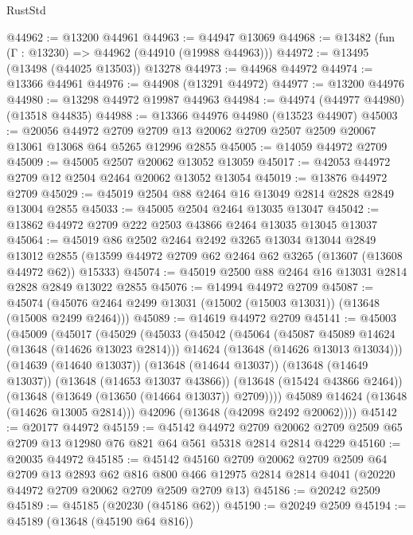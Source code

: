 \begin{lexlean}{RustStd}
\begin{coremodule}
@44962 := @13200 @44961
@44963 := @44947 @13069
@44968 := @13482 (fun (Γ : @13230) => @44962 (@44910 (@19988 @44963)))
@44972 := @13495 (@13498 (@44025 @13503)) @13278
@44973 := @44968 @44972
@44974 := @13366 @44961
@44976 := @44908 (@13291 @44972)
@44977 := @13200 @44976
@44980 := @13298 @44972 @19987 @44963
@44984 := @44974 (@44977 @44980) (@13518 @44835)
@44988 := @13366 @44976 @44980 (@13523 @44907)
@45003 := @20056
    @44972
    @2709
    @2709
    @13
    @20062
    @2709
    @2507
    @2509
    @20067
    @13061
    @13068
    @64
    @5265
    @12996
    @2855
@45005 := @14059 @44972 @2709
@45009 := @45005 @2507 @20062 @13052 @13059
@45017 := @42053 @44972 @2709 @12 @2504 @2464 @20062 @13052 @13054
@45019 := @13876 @44972 @2709
@45029 := @45019 @2504 @88 @2464 @16 @13049 @2814 @2828 @2849 @13004 @2855
@45033 := @45005 @2504 @2464 @13035 @13047
@45042 := @13862 @44972 @2709 @222 @2503 @43866 @2464 @13035 @13045 @13037
@45064 := @45019
    @86
    @2502
    @2464
    @2492
    @3265
    @13034
    @13044
    @2849
    @13012
    @2855
    (@13599 @44972 @2709 @62 @2464 @62 @3265 (@13607 (@13608 @44972 @62)) @15333)
@45074 := @45019 @2500 @88 @2464 @16 @13031 @2814 @2828 @2849 @13022 @2855
@45076 := @14994 @44972 @2709
@45087 := @45074 (@45076 @2464 @2499 @13031 (@15002 (@15003 @13031)) (@13648 (@15008 @2499 @2464)))
@45089 := @14619 @44972 @2709
@45141 := @45003
    (@45009
      (@45017
        (@45029
          (@45033
            (@45042
              (@45064
                (@45087 @45089 @14624 (@13648 (@14626 @13023 @2814)))
                @14624
                (@13648 (@14626 @13013 @13034)))
              (@14639 (@14640 @13037))
              (@13648 (@14644 @13037))
              (@13648 (@14649 @13037))
              (@13648 (@14653 @13037 @43866))
              (@13648 (@15424 @43866 @2464))
              (@13648 (@13649 (@13650 (@14664 @13037)) @2709))))
          @45089
          @14624
          (@13648 (@14626 @13005 @2814)))
        @42096
        (@13648 (@42098 @2492 @20062))))
@45142 := @20177 @44972
@45159 := @45142
    @44972
    @2709
    @20062
    @2709
    @2509
    @65
    @2709
    @13
    @12980
    @76
    @821
    @64
    @561
    @5318
    @2814
    @2814
    @4229
@45160 := @20035 @44972
@45185 := @45142
    @45160
    @2709
    @20062
    @2709
    @2509
    @64
    @2709
    @13
    @2893
    @62
    @816
    @800
    @466
    @12975
    @2814
    @2814
    @4041
    (@20220 @44972 @2709 @20062 @2709 @2509 @2709 @13)
@45186 := @20242 @2509
@45189 := @45185 (@20230 (@45186 @62))
@45190 := @20249 @2509
@45194 := @45189 (@13648 (@45190 @64 @816))

\end{coremodule}
\end{lexlean}
